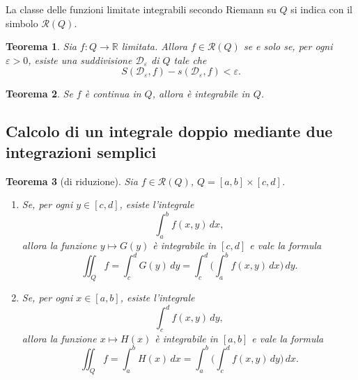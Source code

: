 \documentclass[a4paper]{book}
\numberwithin{equation}{section}
\renewcommand{\epsilon}{\varepsilon}
\theoremstyle{plain}
\newtheorem{teor}{Teorema}[section]
\theoremstyle{definition}
\theoremstyle{remark}
\theoremstyle{example}
\begin{document}
		La classe delle funzioni limitate integrabili secondo Riemann su $Q$ si indica con il simbolo $\mathcal{R}(Q)$.

		\begin{teor}
			Sia $f \colon Q \to \mathbb{R}$ limitata. Allora $f \in \mathcal{R}(Q)$ se e solo se, per ogni $\epsilon > 0$, esiste una suddivisione $\mathcal{D}_{\epsilon}$ di $Q$ tale che
			\begin{equation}
				S(\mathcal{D}_{\epsilon}, f) - s(\mathcal{D}_{\epsilon}, f) < \epsilon.
			\end{equation}
		\end{teor}

		\begin{teor}
			Se $f$ è continua in $Q$, allora è integrabile in $Q$.
		\end{teor}
		\subsection{Calcolo di un integrale doppio mediante due integrazioni semplici}
		\begin{teor}[di riduzione]
			Sia $f \in \mathcal{R}(Q)$, $Q = [a, b] \times [c, d]$.
			\begin{enumerate}
				\item Se, per ogni $y \in [c, d]$, esiste l'integrale
				\begin{equation*}
					\int_a^b f(x, y) \, dx,
				\end{equation*}
				allora la funzione $y \mapsto G(y)$ è integrabile in $[c, d]$ e vale la formula
				\begin{equation}
					\label{eqn:iteratox}
					\iint_Q f = \int_c^d G(y)\, dy = \int_c^d \biggl( \int_a^b f(x, y) \, dx \biggr) \, dy.
				\end{equation}

				\item Se, per ogni $x \in [a, b]$, esiste l'integrale
				\begin{equation*}
					\int_c^d f(x,y) \, dy,
				\end{equation*}
				allora la funzione $x \mapsto H(x)$ è integrabile in $[a, b]$ e vale la formula
				\begin{equation}
					\label{eqn:iteratoy}
					\iint_Q f = \int_a^b H(x) \, dx = \int_a^b \biggl( \int_c^d f(x,y) \, dy \biggr) \, dx.
				\end{equation}
			\end{enumerate}
		\end{teor}
\end{document}
